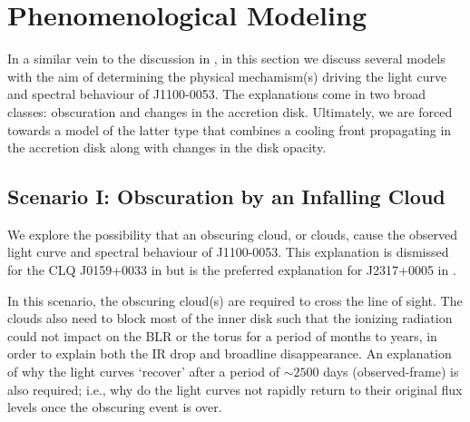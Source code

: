 \documentclass[a4paper,fleqn,usenatbib]{mnras}
\begin{document}
\section{Phenomenological Modeling} 
In a similar vein to the discussion in \cite{Stern2018}, in this
section we discuss several models with the aim of determining the
physical mechamism(s) driving the light curve and spectral behaviour
of J1100-0053. The explanations come in two broad classes: obscuration
and changes in the accretion disk. Ultimately, we are forced towards
a model of the latter type that combines a cooling front propagating
in the accretion disk along with changes in the disk opacity.

\subsection{Scenario I: Obscuration by an Infalling Cloud}
We explore the possibility that an obscuring cloud, or clouds, cause
the observed light curve and spectral behaviour of J1100-0053. This
explanation is dismissed for the CLQ J0159+0033 in \citet{LaMassa2015}
but is the preferred explanation for J2317+0005 in \citet{Guo2016}.

In this scenario, the obscuring cloud(s) are required to cross the line
of sight. The clouds also need to block most of the inner disk such
that the ionizing radiation could not impact on the BLR or the torus
for a period of months to years, in order to explain both the IR drop and
broadline disappearance. An explanation of why the light curves
`recover' after a period of $\sim 2500$ days (observed-frame) is also
required; i.e., why do the light curves not rapidly return to their
original flux levels once the obscuring event is over.
\end{document}
